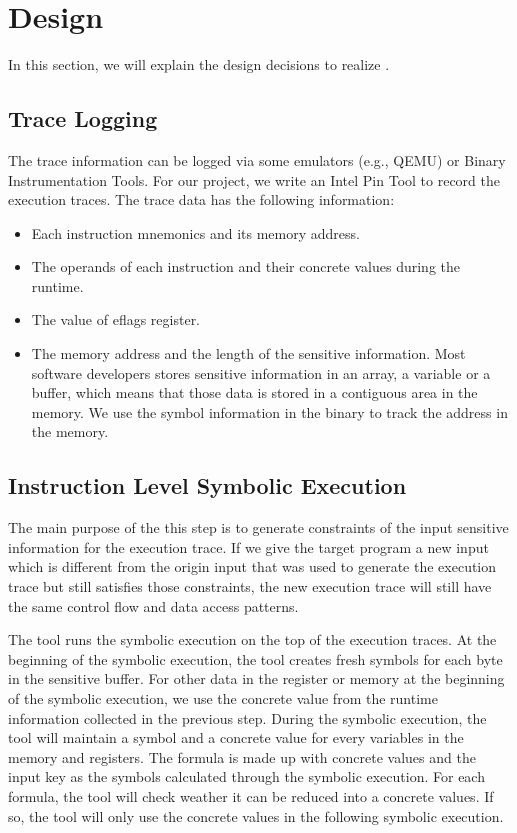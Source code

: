 \section{Design}
In this section, we will explain the design decisions to realize \tool{}. 


\subsection{Trace Logging}
The trace information can be logged via some emulators (e.g., QEMU) or Binary Instrumentation Tools. 
For our project, we write an Intel Pin Tool to record the execution traces. 
The trace data has the following information:
\begin{itemize}
    \item Each instruction mnemonics and its memory address.
    \item The operands of each instruction and their concrete values during the 
          runtime.
    \item The value of eflags register.
    \item The memory address and the length of the sensitive information.
     Most software developers stores sensitive information in an array,
     a variable or a buffer, which means that those data is stored in a contiguous 
     area in the memory. We use the symbol information in the binary to track the 
     address in the memory.

\end{itemize}

\subsection{Instruction Level Symbolic Execution}
The main purpose of the this step is to generate constraints of the input 
sensitive information for the execution trace. 
If we give the target program a new input which 
is different from the origin input that was used 
to generate the execution trace but still satisfies those constraints,
 the new execution trace will still have the same control flow and data access patterns. 

The tool runs the symbolic execution on the top of the execution traces. At the beginning of the symbolic execution, the tool creates fresh symbols for each byte in the sensitive buffer. For other data in the register or memory at the beginning of the symbolic execution, we use the concrete value from the runtime information collected in the previous step. During the symbolic execution, the tool will maintain a symbol and a concrete value for every variables in the memory and registers. The formula is made up with concrete values and the input key as the symbols calculated through the symbolic execution. For each formula, the tool will check weather it can be reduced into a concrete values. If so, the tool will only use the concrete values in the following symbolic execution.

